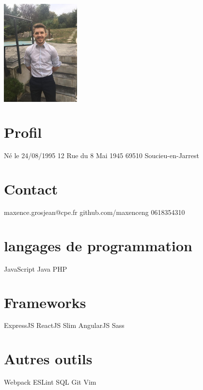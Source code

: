 \documentclass[french]{cv-style}          %
\begin{document}
\lastupdated


\begin{aside}
\includegraphics[width=4cm]{photo}
\section{Profil}
Né le 24/08/1995
12 Rue du 8 Mai 1945
69510 Soucieu-en-Jarrest
%
\section{Contact}
maxence.grosjean@cpe.fr
github.com/maxenceng
0618354310
%
\section{langages de programmation}
JavaScript
Java
PHP
%
\section{Frameworks}
ExpressJS
ReactJS
Slim
AngularJS
Sass
%
\section{Autres outils}
Webpack
ESLint
SQL
Git
Vim
%
\end{aside}

\end{document}
